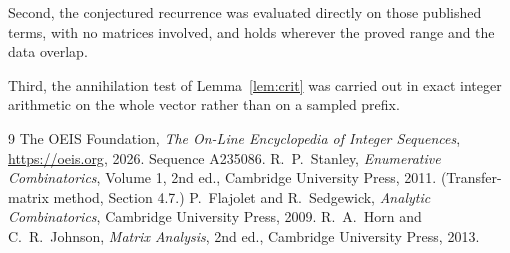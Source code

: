 \documentclass[11pt,a4paper]{article}
\theoremstyle{plain}
\theoremstyle{definition}
\begin{document}
Second, the conjectured recurrence was evaluated directly on those published terms, with no
matrices involved, and holds wherever the proved range and the data overlap.

Third, the annihilation test of Lemma~\ref{lem:crit} was carried out in exact integer
arithmetic on the whole vector rather than on a sampled prefix.

\begin{thebibliography}{9}
 The OEIS Foundation, \emph{The On-Line Encyclopedia of Integer
Sequences}, \url{https://oeis.org}, 2026. Sequence A235086.
 R.~P.~Stanley, \emph{Enumerative Combinatorics}, Volume 1, 2nd ed.,
Cambridge University Press, 2011. (Transfer-matrix method, Section 4.7.)
 P.~Flajolet and R.~Sedgewick, \emph{Analytic Combinatorics}, Cambridge
University Press, 2009.
 R.~A.~Horn and C.~R.~Johnson, \emph{Matrix Analysis}, 2nd ed., Cambridge
University Press, 2013.
\end{thebibliography}
\end{document}
